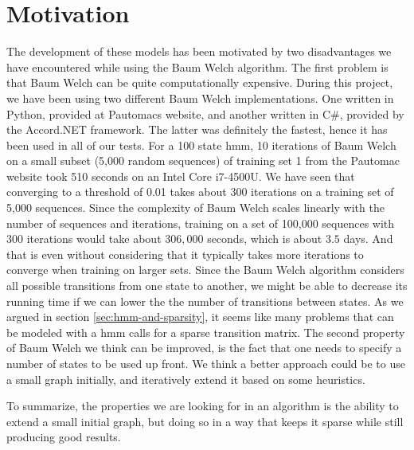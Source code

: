 \section{Motivation}
The development of these models has been motivated by two disadvantages we have encountered while using the Baum Welch algorithm.
The first problem is that Baum Welch can be quite computationally expensive.
During this project, we have been using two different Baum Welch implementations. One written in Python, provided at Pautomacs website, and another written in C\#, provided by the Accord.NET framework. The latter was definitely the fastest, hence it has been used in all of our tests.
For a 100 state \gls{hmm}, 10 iterations of Baum Welch on a small subset (5,000 random sequences) of training set 1 from the Pautomac website took 510 seconds on an Intel Core i7-4500U. We have seen that converging to a threshold of 0.01 takes about 300 iterations on a training set of 5,000 sequences. Since the complexity of Baum Welch scales linearly with the number of sequences and iterations, training on a set of 100,000 sequences with 300 iterations would take about $306,000$ seconds, which is about $3.5$ days. And that is even without considering that it typically takes more iterations to converge when training on larger sets. 
Since the Baum Welch algorithm considers all possible transitions from one state to another, we might be able to decrease its running time if we can lower the the number of transitions between states. As we argued in section \ref{sec:hmm-and-sparsity}, it seems like many problems that can be modeled with a \gls{hmm} calls for a sparse transition matrix.
The second property of Baum Welch we think can be improved, is the fact that one needs to specify a number of states to be used up front.
We think a better approach could be to use a small graph initially, and iteratively extend it based on some heuristics.

To summarize, the properties we are looking for in an algorithm is the ability to extend a small initial graph, but doing so in a way that keeps it sparse while still producing good results.